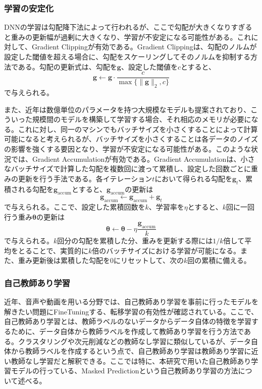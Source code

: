 \documentclass[12pt]{jarticle}
\numberwithin{equation}{section}    %
\numberwithin{figure}{section}      %
\numberwithin{table}{section}      %
\begin{document}
\subsubsection{学習の安定化}
DNNの学習は勾配降下法によって行われるが、ここで勾配が大きくなりすぎると重みの更新幅が過剰に大きくなり、学習が不安定になる可能性がある。これに対して、Gradient Clippingが有効である。Gradient Clippingは、勾配のノルムが設定した閾値を超える場合に、勾配をスケーリングしてそのノルムを抑制する方法である。勾配の更新式は、勾配を$\bm{g}$、設定した閾値を$c$とすると、
\begin{equation}
    \bm{g} \gets \bm{g} \cdot \frac{c}{\max \{\|\bm{g}\|_{2}, c\}}
\end{equation}
で与えられる。

また、近年は数億単位のパラメータを持つ大規模なモデルも提案されており、こういった規模間のモデルを構築して学習する場合、それ相応のメモリが必要になる。これに対し、同一のマシンでもバッチサイズを小さくすることによって計算可能になると考えられるが、バッチサイズを小さくすることは各データのノイズの影響を強くする要因となり、学習が不安定になる可能性がある。このような状況では、Gradient Accumulationが有効である。Gradient Accumulationは、小さなバッチサイズで計算した勾配を複数回に渡って累積し、設定した回数ごとに重みの更新を行う手法である。各イテレーション$t$において得られる勾配を$\bm{g}_{t}$、累積される勾配を$\bm{g}_{\text{accum}}$とすると、$\bm{g}_{\text{accum}}$の更新は
\begin{equation}
    \bm{g}_{\text{accum}} \gets \bm{g}_{\text{accum}} + \bm{g}_{t}
\end{equation}
で与えられる。ここで、設定した累積回数を$k$、学習率を$\eta$とすると、$k$回に一回行う重み$\bm{\theta}$の更新は
\begin{equation}
    \bm{\theta} \gets \bm{\theta} - \eta \frac{\bm{g}_{\text{accum}}}{k}
\end{equation}
で与えられる。$k$回分の勾配を累積した分、重みを更新する際には$1 / k$倍して平均をとることで、実質的に$k$倍のバッチサイズにおける学習が可能になる。また、重み更新後は累積した勾配を0にリセットして、次の$k$回の累積に備える。

\subsubsection{自己教師あり学習}
近年、音声や動画を用いる分野では、自己教師あり学習を事前に行ったモデルを解きたい問題にFineTuningする、転移学習の有効性が確認されている。ここで、自己教師あり学習とは、教師ラベルのないデータからデータ自体の特徴を学習するために、データ自体から教師ラベルを作成して教師あり学習を行う方法である。クラスタリングや次元削減などの教師なし学習に類似しているが、データ自体から教師ラベルを作成するという点で、自己教師あり学習は教師あり学習に近い教師なし学習だと解釈できる。ここでは特に、本研究で用いた自己教師あり学習モデルの行っている、Masked Predictionという自己教師あり学習の方法について述べる。
\end{document}

